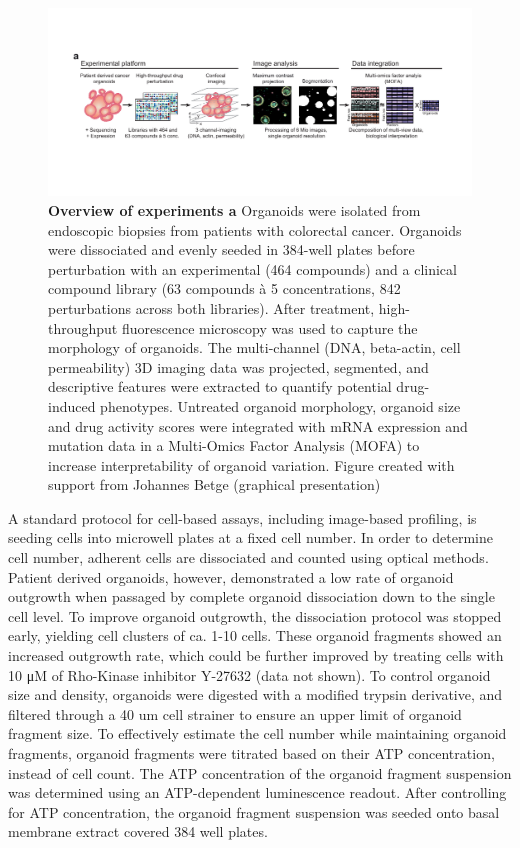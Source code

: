 \begin{flushleft}
\begin{figure}[h]
\centering
\includegraphics[width=\textwidth,
                height=\textheight,
                keepaspectratio]{figures/pdf/fig_130.pdf}
\caption{\textbf{Overview of experiments a} Organoids were isolated from endoscopic biopsies from patients with colorectal cancer. Organoids were dissociated and evenly seeded in 384-well plates before perturbation with an experimental (464 compounds) and a clinical compound library (63 compounds à 5 concentrations, 842 perturbations across both libraries). After treatment, high-throughput fluorescence microscopy was used to capture the morphology of organoids.  The multi-channel (DNA, beta-actin, cell permeability) 3D imaging data was projected, segmented, and descriptive features were extracted to quantify potential drug-induced phenotypes. Untreated organoid morphology, organoid size and drug activity scores were integrated with mRNA expression and mutation data in a Multi-Omics Factor Analysis (MOFA) to increase interpretability of organoid variation. Figure created with support from Johannes Betge (graphical presentation)}
\label{fig_130}
\end{figure}

\bigbreak

A standard protocol for cell-based assays, including image-based profiling, is seeding cells into microwell plates at a fixed cell number. In order to determine cell number, adherent cells are dissociated and counted using optical methods. Patient derived organoids, however, demonstrated a low rate of organoid outgrowth when passaged by complete organoid dissociation down to the single cell level. To improve organoid outgrowth, the dissociation protocol was stopped early, yielding cell clusters of ca. 1-10 cells. These organoid fragments showed an increased outgrowth rate, which could be further improved by treating cells with 10 μM of Rho-Kinase inhibitor Y-27632 (data not shown). To control organoid size and density, organoids were digested with a modified trypsin derivative, and filtered through a 40 um cell strainer to ensure an upper limit of organoid fragment size. To effectively estimate the cell number while maintaining organoid fragments, organoid fragments were titrated based on their ATP concentration, instead of cell count. The ATP concentration of the organoid fragment suspension was determined using an ATP-dependent luminescence readout. After controlling for ATP concentration, the organoid fragment suspension was seeded onto basal membrane extract covered 384 well plates.


\end{flushleft}
